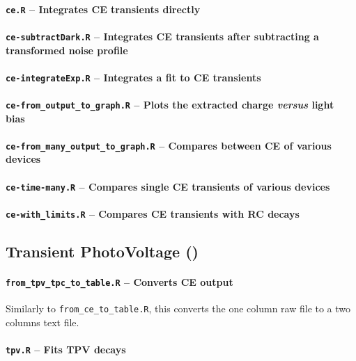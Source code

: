 		\paragraph{\texttt{ce.R} -- Integrates CE transients directly}
		\paragraph{\texttt{ce-subtractDark.R} -- Integrates CE transients after subtracting a transformed noise profile}
		\paragraph{\texttt{ce-integrateExp.R} -- Integrates a fit to CE transients}
		\paragraph{\texttt{ce-from_output_to_graph.R} -- Plots the extracted charge \textsl{versus} light bias}
		\paragraph{\texttt{ce-from_many_output_to_graph.R} -- Compares between CE of various devices}
		\paragraph{\texttt{ce-time-many.R} -- Compares single CE transients of various devices}
		\paragraph{\texttt{ce-with_limits.R} -- Compares CE transients with RC decays}

	\subsection{Transient PhotoVoltage ()}\label{r_tpv}

		\paragraph{\texttt{from_tpv_tpc_to_table.R} -- Converts CE output}
		Similarly to \texttt{from_ce_to_table.R}, this converts the one column raw file to a two columns text file.

		\paragraph{\texttt{tpv.R} -- Fits TPV decays}
		
